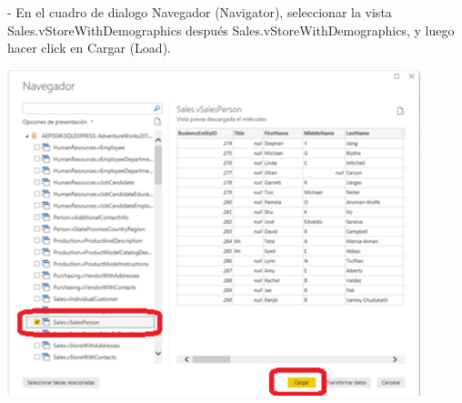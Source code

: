 \newpage
\item{- En el cuadro de dialogo Navegador (Navigator), seleccionar la vista Sales.vStoreWithDemographics después Sales.vStoreWithDemographics, y luego
hacer click en Cargar (Load). }
\begin{center}
\includegraphics[width=12cm]{./Imagenes/image003}
\end{center}

